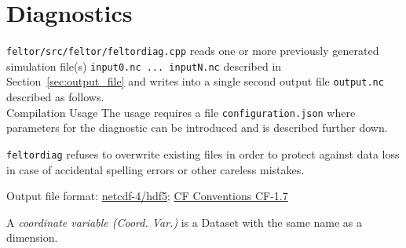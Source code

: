 \section{Diagnostics}\label{sec:diagnostics}
\texttt{feltor/src/feltor/feltordiag.cpp}
reads one or more previously generated simulation file(s) \texttt{input0.nc ... inputN.nc} described in Section~\ref{sec:output_file} and writes into a
 single second output file \texttt{output.nc} described as follows. \\
Compilation
\noindent Usage
The usage requires a file \texttt{configuration.json} where parameters for the diagnostic can be introduced and is described further down.
\begin{tcolorbox}[title=Note]
\texttt{feltordiag} refuses to overwrite existing files in order to protect against data loss in case of accidental spelling
errors or other careless mistakes.
\end{tcolorbox}

Output file format: \href{https://www.unidata.ucar.edu/software/netcdf/docs/}{netcdf-4/hdf5};
\href{http://cfconventions.org/Data/cf-conventions/cf-conventions-1.7/cf-conventions.html}{CF Conventions CF-1.7}

A \textit{coordinate variable (Coord. Var.)} is a Dataset with the same name as a dimension.

